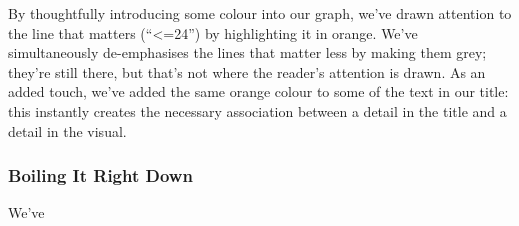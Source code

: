 \documentclass[
  letterpaper,
  DIV=11,
  numbers=noendperiod]{scrartcl}
\begin{document}
By thoughtfully introducing some colour into our graph, we've drawn
attention to the line that matters (``\textless=24'') by highlighting it
in orange. We've simultaneously de-emphasises the lines that matter less
by making them grey; they're still there, but that's not where the
reader's attention is drawn. As an added touch, we've added the same
orange colour to some of the text in our title: this instantly creates
the necessary association between a detail in the title and a detail in
the visual.

\hypertarget{boiling-it-right-down}{%
\subsubsection{Boiling It Right Down}\label{boiling-it-right-down}}

We've
\end{document}
